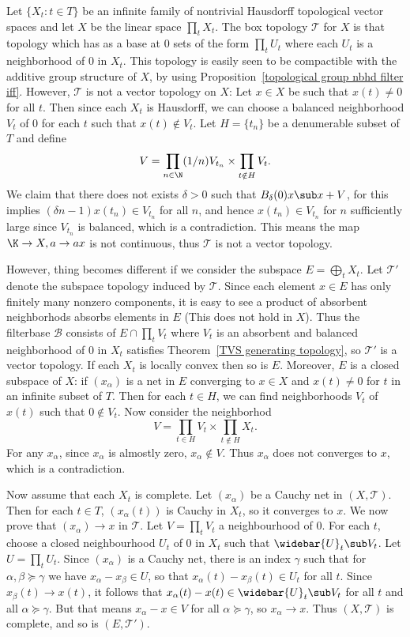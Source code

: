 \begin{example}\label{TVS box product}
Let $\{X_t:t\in T\}$ be an infinite family of nontrivial Hausdorff topological vector spaces and let $X$ be the linear space $\prod_tX_t$. The box topology $\mathcal{T}$ for $X$ is that topology which has as a base at $0$ sets of the form $\prod_tU_t$ where each $U_t$ is a neighborhood of $0$ in $X_t$. This topology is easily seen to be compactible with the additive group structure of $X$, by using Proposition~\ref{topological group nbhd filter iff}. However, $\mathcal{T}$ is not a vector topology on $X$: Let $x\in X$ be such that $x(t)\neq 0$ for all $t$. Then since each $X_t$ is Hausdorff, we can choose a balanced neighborhood $V_t$ of $0$ for each $t$ such that $x(t)\notin V_t$. Let $H=\{t_n\}$ be a denumerable subset of $T$ and define
\[V=\prod_{n\in\N}(1/n)V_{t_n}\times\prod_{t\notin H}V_t.\]
We claim that there does not exists $\delta>0$ such that $B_\delta(0)x\sub x+V$, for this implies $(\delta n-1)x(t_n)\in V_{t_n}$ for all $n$, and hence $x(t_n)\in V_{t_n}$ for $n$ sufficiently large since $V_{t_n}$ is balanced, which is a contradiction. This means the map $\K\to X,a\to ax$ is not continuous, thus $\mathcal{T}$ is not a vector topology.\par
However, thing becomes different if we consider the subspace $E=\bigoplus_tX_t$. Let $\mathcal{T}'$ denote the subspace topology induced by $\mathcal{T}$. Since each element $x\in E$ has only finitely many nonzero components, it is easy to see a product of absorbent neighborhods absorbs elements in $E$ (This does not hold in $X$). Thus the filterbase $\mathcal{B}$ consists of $E\cap\prod_tV_t$ where $V_t$ is an absorbent and balanced neighborhood of $0$ in $X_t$ satisfies Theorem~\ref{TVS generating topology}, so $\mathcal{T}'$ is a vector topology. If each $X_t$ is locally convex then so is $E$. Moreover, $E$ is a closed subspace of $X$: if $(x_\alpha)$ is a net in $E$ converging to $x\in X$ and $x(t)\neq 0$ for $t$ in an infinite subset of $T$. Then for each $t\in H$, we can find neighborhoods $V_t$ of $x(t)$ such that $0\notin V_t$. Now consider the neighborhod
\[V=\prod_{t\in H}V_t\times\prod_{t\notin H}X_t.\]
For any $x_\alpha$, since $x_\alpha$ is almostly zero, $x_\alpha\notin V$. Thus $x_\alpha$ does not converges to $x$, which is a contradiction.\par
Now assume that each $X_t$ is complete. Let $(x_\alpha)$ be a Cauchy net in $(X,\mathcal{T})$. Then for each $t\in T$, $(x_\alpha(t))$ is Cauchy in $X_t$, so it converges to $x$. We now prove that $(x_\alpha)\to x$ in $\mathcal{T}$. Let $V=\prod_tV_t$ a neighbourhood of $0$. For each $t$, choose a closed neighbourhood $U_t$ of $0$ in $X_t$ such that $\widebar{U}_t\sub V_t$. Let $U=\prod_tU_t$. Since $(x_\alpha)$ is a Cauchy net, there is an index $\gamma$ such that for $\alpha,\beta\succeq\gamma$ we have $x_\alpha-x_\beta\in U$, so that $x_\alpha(t)-x_\beta(t)\in U_t$ for all $t$. Since $x_\beta(t)\to x(t)$, it follows that $x_\alpha(t)-x(t)\in\widebar{U}_t\sub V_t$ for all $t$ and all $\alpha\succeq\gamma$. But that means $x_\alpha-x\in V$ for all $\alpha\succeq\gamma$, so $x_\alpha\to x$. Thus $(X,\mathcal{T})$ is complete, and so is $(E,\mathcal{T}')$.
\end{example}
